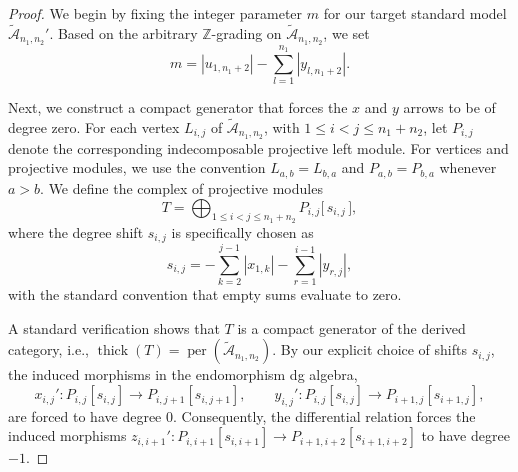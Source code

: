 \documentclass[a4paper, reqno, 11pt]{amsart}
\theoremstyle{definition}
\begin{document}
\begin{proof}
	We begin by fixing the integer parameter $m$ for our target standard model $\widetilde{\mathcal{A}}_{n_1,n_2}'$. Based on the arbitrary $\mathbb{Z}$-grading on $\widetilde{\mathcal{A}}_{n_1,n_2}$, we set
	\[
	m = |u_{1,n_1+2}| - \sum\limits_{l=1}^{n_1} |y_{l,n_1+2}|.
	\]
	
	Next, we construct a compact generator that forces the $x$ and $y$ arrows to be of degree zero. 
	For each vertex \(L_{i,j}\) of \(\widetilde{\mathcal A}_{n_1,n_2}\), with \(1\leq i<j\leq n_1+n_2\), let \(P_{i,j}\) denote the corresponding indecomposable projective left module. For vertices and projective modules, we use the convention \(L_{a,b}=L_{b,a}\) and \(P_{a,b}=P_{b,a}\) whenever \(a>b\). We define the complex of projective modules
	\[
	T = \bigoplus_{1\le i<j\le n_1+n_2} P_{i,j}\bigl[\,s_{i,j}\,\bigr],
	\]
	where the degree shift $s_{i,j}$ is specifically chosen as
	\[
	s_{i,j} = -\sum\limits_{k=2}^{j-1}|x_{1,k}| - \sum\limits_{r=1}^{i-1}|y_{r,j}|,
	\]
	with the standard convention that empty sums evaluate to zero. 
	
	A standard verification shows that $T$ is a compact generator of the derived category, i.e., $\operatorname{thick}(T) = \operatorname{per}(\widetilde{\mathcal{A}}_{n_1,n_2})$. By our explicit choice of shifts $s_{i,j}$, the induced morphisms in the endomorphism dg algebra,
	\[
	x_{i,j}'\colon P_{i,j}[s_{i,j}] \longrightarrow P_{i,j+1}[s_{i,j+1}],\qquad
	y_{i,j}'\colon P_{i,j}[s_{i,j}] \longrightarrow P_{i+1,j}[s_{i+1,j}],
	\]
	are forced to have degree $0$. Consequently, the differential relation forces the induced morphisms $z_{i,i+1}' \colon P_{i,i+1}[s_{i,i+1}] \longrightarrow P_{i+1,i+2}[s_{i+1,i+2}]$ to have degree $-1$. 
	

\end{proof}
\end{document}
